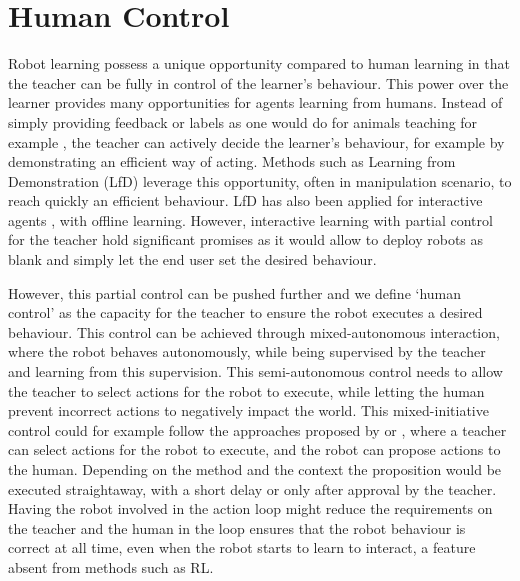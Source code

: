 \documentclass[letterpaper, 10 pt, conference]{ieeeconf}  %
\begin{document}



\section{Human Control}

Robot learning possess a unique opportunity compared to human learning in that the teacher can be fully in control of the learner's behaviour. This power over the learner provides many opportunities for agents learning from humans. Instead of simply providing feedback or labels as one would do for animals teaching for example \cite{knox2009interactively}, the teacher can actively decide the learner's behaviour, for example by demonstrating an efficient way of acting. Methods such as Learning from Demonstration (LfD) \cite{argall2009survey,billard2008robot} leverage this opportunity, often in manipulation scenario, to reach quickly an efficient behaviour. LfD has also been applied for interactive agents \cite{liu2014train,sequeira2016discovering}, with offline learning. However, interactive learning with partial control for the teacher \cite{thomaz2008teachable,chernova2009interactive,saunders2018trial} hold significant promises as it would allow to deploy robots as blank and simply let the end user set the desired behaviour.

However, this partial control can be pushed further and we define `human control' as the capacity for the teacher to ensure the robot executes a desired behaviour. This control can be achieved through mixed-autonomous interaction, where the robot behaves autonomously, while being supervised by the teacher and learning from this supervision. This semi-autonomous control needs to allow the teacher to select actions for the robot to execute, while letting the human prevent incorrect actions to negatively impact the world. This mixed-initiative control could for example follow the approaches proposed by \cite{munzer2017efficient} or \cite{senft2015sparc}, where a teacher can select actions for the robot to execute, and the robot can propose actions to the human. Depending on the method and the context the proposition would be executed straightaway, with a short delay or only after approval by the teacher. Having the robot involved in the action loop might reduce the requirements on the teacher and the human in the loop ensures that the robot behaviour is correct at all time, even when the robot starts to learn to interact, a feature absent from methods such as RL.
\end{document}

